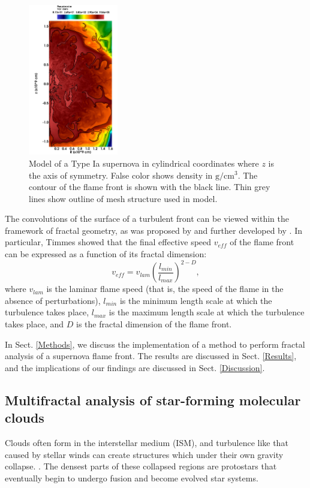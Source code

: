 \documentclass[iop]{emulateapj}
\begin{document}
\begin{figure}[ht]
	\begin{center}
	\includegraphics[width=0.35\textwidth,clip=true]{Graphics/n7d1r10t15b0011_cropped.png}
	\caption{Model of a Type Ia supernova in cylindrical coordinates where $z$ is the axis of symmetry. False color shows density in $\mathrm{g/cm^3}$. The contour of the flame front is shown with the black line. Thin grey lines show outline of mesh structure used in model.
	\label{f:flamefrontwithcontour}}
	\end{center}
	\end{figure} 

The convolutions of the surface of a turbulent front can be viewed within the framework of fractal geometry, as was proposed by \cite{Mandelbrot1975} and further developed by \cite{Timmes1994}. In particular, Timmes showed that the final effective speed $v_{eff}$ of the flame front can be expressed as a function of its fractal dimension:
\begin{equation} 
	v_{eff} = v_{lam} \left(\frac{l_{min}}{l_{max}}\right)^{2 - D},
\end{equation}
where $v_{lam}$ is the laminar flame speed (that is, the speed of the flame in the absence of perturbations), $l_{min}$ is the minimum length scale at which the turbulence takes place, $l_{max}$ is the maximum length scale at which the turbulence takes place, and $ D $ is the fractal dimension of the flame front.

In Sect. \ref{Methods}, we discuss the implementation of a method to perform fractal analysis of a supernova flame front. The results are discussed in Sect. \ref{Results}, and the implications of our findings are discussed in Sect. \ref{Discussion}.

\subsection{Multifractal analysis of star-forming molecular clouds}
Clouds often form in the interstellar medium (ISM), and turbulence like that caused by stellar winds can create structures which under their own gravity collapse. \citep{Bergin2007}. The densest parts of these collapsed regions are protostars that eventually begin to undergo fusion and become evolved star systems. 
\end{document}
